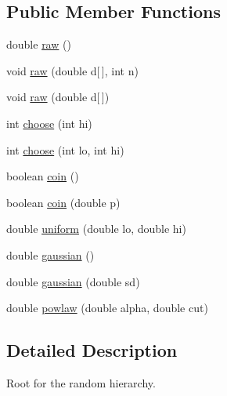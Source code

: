 \subsection*{Public Member Functions}
\begin{DoxyCompactItemize}
\item 
double \hyperlink{interfacenet_1_1sf_1_1jclec_1_1util_1_1random_1_1_i_rand_gen_ac25d104f8a74250e6ee2468d300fbc97}{raw} ()
\item 
void \hyperlink{interfacenet_1_1sf_1_1jclec_1_1util_1_1random_1_1_i_rand_gen_ac30d440c578db88288430b1b8c36cace}{raw} (double d\mbox{[}$\,$\mbox{]}, int n)
\item 
void \hyperlink{interfacenet_1_1sf_1_1jclec_1_1util_1_1random_1_1_i_rand_gen_a200557979a79ca8e7a0878d41099b966}{raw} (double d\mbox{[}$\,$\mbox{]})
\item 
int \hyperlink{interfacenet_1_1sf_1_1jclec_1_1util_1_1random_1_1_i_rand_gen_a98171510a2905523f08ab7cfd59ddc98}{choose} (int hi)
\item 
int \hyperlink{interfacenet_1_1sf_1_1jclec_1_1util_1_1random_1_1_i_rand_gen_ac49d06156eeeea535792996b15f8b8a4}{choose} (int lo, int hi)
\item 
boolean \hyperlink{interfacenet_1_1sf_1_1jclec_1_1util_1_1random_1_1_i_rand_gen_a59c165689aeaed76946f86e780da4bb3}{coin} ()
\item 
boolean \hyperlink{interfacenet_1_1sf_1_1jclec_1_1util_1_1random_1_1_i_rand_gen_a72fb48421115797f64d7eba977094d76}{coin} (double p)
\item 
double \hyperlink{interfacenet_1_1sf_1_1jclec_1_1util_1_1random_1_1_i_rand_gen_a03e4b879098129fd153ee8590fb2c98a}{uniform} (double lo, double hi)
\item 
double \hyperlink{interfacenet_1_1sf_1_1jclec_1_1util_1_1random_1_1_i_rand_gen_ad27d74d84372c2f39ef32466eeae655d}{gaussian} ()
\item 
double \hyperlink{interfacenet_1_1sf_1_1jclec_1_1util_1_1random_1_1_i_rand_gen_a140ae908e5c603244d37e8095265271d}{gaussian} (double sd)
\item 
double \hyperlink{interfacenet_1_1sf_1_1jclec_1_1util_1_1random_1_1_i_rand_gen_aea94f3f66f7533cdccd7f3312bd9b149}{powlaw} (double alpha, double cut)
\end{DoxyCompactItemize}


\subsection{Detailed Description}
Root for the random hierarchy.

